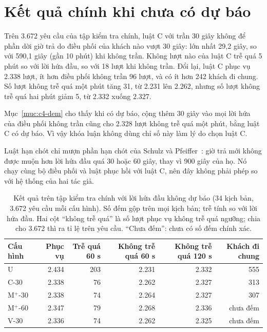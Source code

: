 \section{Kết quả chính khi chưa có dự báo}
\label{muc:c4-ketqua}

Trên 3.672 yêu cầu của tập kiểm tra chính, luật C với trần 30 giây không để phần dời giờ trả do điều phối của khách
nào vượt 30 giây: lớn nhất 29,2 giây, so với 590,1 giây (gần 10 phút) khi không trần. Không lượt nào của luật C trễ
quá 5 phút so với lời hứa đầu, so với 18 lượt khi không trần. Đổi lại, luật C phục vụ 2.338 lượt, ít hơn điều phối
không trần 96 lượt, và có ít hơn 242 khách đi chung. Số lượt không trễ quá một phút tăng 31, từ 2.231 lên 2.262, nhưng
số lượt không trễ quá hai phút giảm 5, từ 2.332 xuống 2.327.

Mục~\ref{muc:c4-dem} cho thấy khi có dự báo, cộng thêm 30 giây vào mọi lời hứa của điều phối không trần cũng cho 2.328
lượt không trễ quá một phút, bằng luật C có dự báo. Vì vậy khóa luận không dùng chỉ số này làm lý do chọn luật C.

Luật hạn chót chỉ mượn phần hạn chót của Schulz và Pfeiffer~\cite{schulz2026}: giờ trả mới không được muộn hơn lời hứa
đầu quá 30 hoặc 60 giây, thay vì 900 giây của họ. Nó chạy cùng bộ điều phối và luật phục hồi với luật C, nên đây không
phải phép so với hệ thống của hai tác giả.

\begin{table}[htbp]
\centering
\caption{Kết quả trên tập kiểm tra chính với lời hứa đầu không dự báo (34 kịch bản, 3.672 yêu cầu mỗi
cấu hình). Số đếm gộp trên mọi kịch bản; trễ tính so với lời hứa đầu. Hai cột ``không trễ quá'' là số lượt phục vụ
không trễ quá ngưỡng; chia cho 3.672 thì ra tỉ lệ trên yêu cầu. ``Chưa đếm'': chưa có số đếm chính xác.}
\label{bang:c4-chinh}
\small
\begin{tabular}{@{}lrrrrr@{}}
\toprule
\textbf{Cấu hình} & \textbf{Phục vụ} & \textbf{Trễ quá 60 s} & \textbf{Không trễ quá 60 s} &
\textbf{Không trễ quá 120 s} & \textbf{Khách đi chung}\\
\midrule
U & 2.434 & 203 & 2.231 & 2.332 & 555\\
C-30 & 2.338 & 76 & 2.262 & 2.327 & 313\\
M$^{+}$-30 & 2.338 & 74 & 2.264 & 2.327 & 307\\
M$^{+}$-60 & 2.347 & 79 & 2.268 & 2.336 & chưa đếm\\
V-30 & 2.336 & 74 & 2.262 & 2.325 & chưa đếm\\
\bottomrule
\end{tabular}
\end{table}

